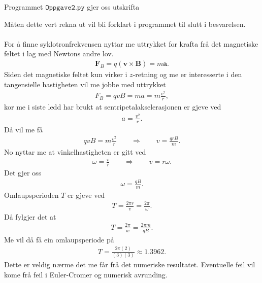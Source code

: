 \documentclass[11pt, a4paper]{article}
\begin{document}
  Programmet $\texttt{Oppgave2.py}$ gjer oss utskrifta
  \begin{center}
    
  \end{center}
  Måten dette vert rekna ut vil bli forklart i programmet til slutt i besvarelsen. \\ \\

  For å finne syklotronfrekvensen nyttar me uttrykket for krafta frå det magnetiske feltet i lag med Newtons andre lov.
  \begin{align*}
    \mathbf{F}_B = q\left( \mathbf{v} \times \mathbf{B} \right) = m\mathbf{a}.
  \end{align*}
  Siden det magnetiske feltet kun virker i $z$-retning og me er interesserte i den tangensielle hastigheten vil me jobbe med uttrykket
  \begin{align*}
    F_B = qvB = ma = m\frac{v^2}{r},
  \end{align*}
  kor me i siste ledd har brukt at sentripetalakselerasjonen er gjeve ved
  \begin{align*}
    a = \frac{v^2}{r}.
  \end{align*}
  Då vil me få
  \begin{align*}
    qvB = m\frac{v^2}{r} \qquad \Rightarrow \qquad v = \frac{qrB}{m}.
  \end{align*}
  No nyttar me at vinkelhastigheten er gitt ved 
  \begin{align*}
    \omega = \frac{v}{r} \qquad \Rightarrow \qquad v = r\omega.
  \end{align*}
  Det gjer oss
  \begin{align*}
    \omega = \frac{qB}{m}.
  \end{align*}
  Omlaupsperioden $T$ er gjeve ved 
  \begin{align*}
    T = \frac{2\pi r}{v} = \frac{2\pi}{\omega}.
  \end{align*}
  Då fylgjer det at
  \begin{align*}
    T = \frac{2\pi}{w} = \frac{2\pi m}{qB}.
  \end{align*}
  Me vil då få ein omlaupsperiode på 
  \begin{align*}
    T = \frac{2\pi (2)}{(3)(3)} \approx 1.3962.
  \end{align*}
  Dette er veldig nærme det me får frå det numeriske resultatet. Eventuelle feil vil kome frå feil i Euler-Cromer og numerisk avrunding.
\end{document}
